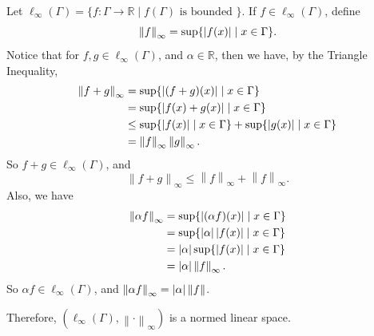 \documentclass[notoc,notitlepage]{tufte-book}
\newcommand{\norm}[1]{\left\| #1 \right\|}
\begin{document}
\begin{eg}\label{eg:l_infty_on_gamma}
  Let $\ell_\infty(\Gamma) = \{ f : \Gamma \to \mathbb{R} \mid f(\Gamma) \text{ is bounded } \}$. If $f \in \ell_\infty(\Gamma)$, define
  \begin{equation*}
    \norm{f}_\infty = \sup \{ \abs{f(x)} \mid x \in \Gamma \}.
  \end{equation*}
  Notice that for $f, g \in \ell_\infty(\Gamma)$, and $\alpha \in \mathbb{R}$, then we have, by the Triangle Inequality,
  \begin{align*}
    \norm{f + g}_\infty &= \sup \{ \abs{ (f + g)(x) } \mid x \in \Gamma \} \\
                        &= \sup \{ \abs{ f(x) + g(x) } \mid x \in \Gamma \} \\
                        &\leq \sup \{ \abs{ f(x) } \mid x \in \Gamma \} + \sup \{ \abs{ g(x) } \mid x \in \Gamma \} \\
                        &= \norm{f}_\infty \norm{g}_\infty.
  \end{align*}
  So $f + g \in \ell_\infty(\Gamma)$, and
  \begin{equation*}
    \norm{f + g}_\infty \leq \norm{f}_\infty + \norm{f}_\infty.
  \end{equation*}
  Also, we have
  \begin{align*}
    \norm{\alpha f}_\infty &= \sup \{ \abs{ (\alpha f)(x) } \mid x \in \Gamma \} \\
                           &= \sup \{ \abs{\alpha} \abs{ f(x) } \mid x \in \Gamma \} \\
                           &= \abs{\alpha} \sup \{ \abs{f(x)} \mid x \in \Gamma \} \\
                           &= \abs{\alpha} \norm{f}_\infty.
  \end{align*}
  So $\alpha f \in \ell_\infty(\Gamma)$, and $\norm{\alpha f}_\infty = \abs{\alpha} \norm{f}$.

  Therefore, $(\ell_\infty(\Gamma), \norm\cdot_\infty)$ is a normed linear space.
\end{eg}
\end{document}
